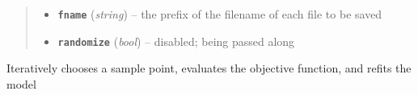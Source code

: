 \documentclass[letterpaper,10pt,english]{sphinxmanual}
\begin{document}
\begin{fulllineitems}
\begin{fulllineitems}
\begin{quote}
\begin{description}
\begin{itemize}
\item {} 
\textbf{\texttt{fname}} (\emph{string}) -- the prefix of the filename of each file to be saved

\item {} 
\textbf{\texttt{randomize}} (\emph{bool}) -- disabled; being passed along

\end{itemize}

\end{description}\end{quote}

Iteratively chooses a sample point, evaluates the objective function, and refits the model

\end{fulllineitems}


\end{fulllineitems}

\label{index:module-smbo.models}\label{index:module-models}
\end{document}
